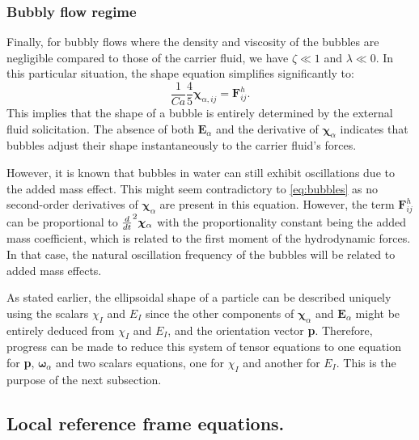 \subsubsection{Bubbly flow regime}
Finally, for bubbly flows where the density and viscosity of the bubbles are negligible compared to those of the carrier fluid, we have $\zeta \ll 1$ and $\lambda \ll 0$. 
In this particular situation, the shape equation simplifies significantly to:
\begin{equation}
    \frac{1}{Ca}
    \frac{4  }{5} \bm\chi_{\alpha,ij}
    = \textbf{F}_{ij}^h. 
    \label{eq:bubbles}
\end{equation}
This implies that the shape of a bubble is entirely determined by the external fluid solicitation. 
The absence of both $\textbf{E}_\alpha$ and the derivative of $\bm\chi_\alpha$ indicates that bubbles adjust their shape instantaneously to the carrier fluid’s forces.

However, it is known that bubbles in water can still exhibit oscillations due to the added mass effect. 
This might seem contradictory to \ref{eq:bubbles} as no second-order derivatives of $\bm\chi_\alpha$ are present in this equation. 
However, the term $\textbf{F}_{ij}^h$ can be proportional to $\frac{d}{dt}^2 \bm\chi_\alpha$ with the proportionality constant being the added mass coefficient, which is related to the first moment of the hydrodynamic forces. 
In that case, the natural oscillation frequency of the bubbles will be related to added mass effects. 

As stated earlier, the ellipsoidal shape of a particle can be described uniquely using the scalars $\chi_I$ and $E_I$ since the other components of $\bm\chi_\alpha$ and $\textbf{E}_\alpha$ might be entirely deduced from $\chi_I$ and $E_I$, and the orientation vector \textbf{p}. 
Therefore, progress can be made to reduce this system of tensor equations to one equation for \textbf{p}, $\bm\omega_\alpha$ and two scalars equations, one for $\chi_I$ and another for $E_I$. 
This is the purpose of the next subsection. 


\subsection{Local reference frame equations.}

